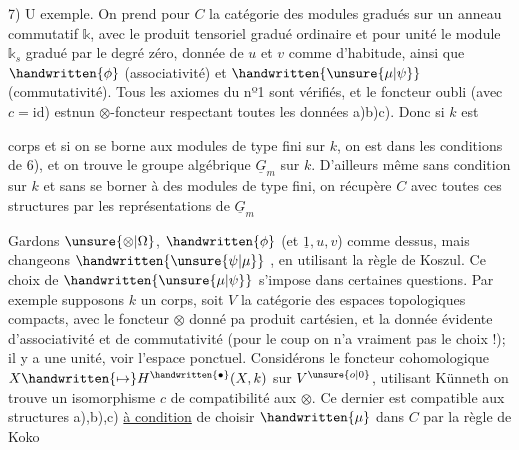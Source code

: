 7) U exemple. On prend pour $C$ la catégorie des modules gradués sur un anneau commutatif $\mathbb{k}$, avec le produit tensoriel gradué ordinaire et pour unité le module $\mathbb{k}_s$ gradué par le degré zéro, donnée de $u$ et $v$ comme d'habitude, ainsi que $\handwritten{\phi}$ (associativité) et $\handwritten{\unsure{\mu|\psi}}$ (commutativité). Tous les axiomes du nº1 sont vérifiés, et le foncteur oubli (avec $c=\mathrm{id}$) estnun $\otimes$-foncteur respectant toutes les données a)b)c). Donc si $k$ est


corps et si on se borne aux modules de type fini sur $k$, on est dans les conditions de 6), et on trouve le groupe algébrique $\underline{G}_m$ sur $k$. D'ailleurs même sans condition sur $k$ et sans se borner à des modules de type fini, on récupère $C$ avec toutes ces structures par les représentations de $\underline{G}_m$\handwritten{\unsure{!|/}}

Gardons $\unsure{\otimes|\Omega}$, $\handwritten{\phi}$ (et $\underline{1},u,v$) comme dessus, mais changeons $\handwritten{\unsure{\psi|\mu}}$ , en  utilisant la règle de Koszul. Ce choix de $\handwritten{\unsure{\mu|\psi}}$ s'impose dans certaines questions. Par exemple supposons $k$ un corps,  soit $V$ la catégorie des espaces topologiques compacts, avec le foncteur $\otimes$ donné pa produit cartésien, et la donnée évidente d'associativité et de commutativité (pour le coup on n'a vraiment pas le choix !); il y a une unité,  voir l'espace ponctuel. Considérons le foncteur cohomologique $X\handwritten{\mapsto}H^{\handwritten{\bullet}}(X,k)$ sur $V^{\unsure{o|0}}$, utilisant Künneth on trouve un isomorphisme $c$ de compatibilité aux $\otimes$. Ce dernier est compatible aux structures a),b),c) \uline{à condition} de choisir $\handwritten{\mu}$ dans $C$ par la règle de Koko\handwritten{!}

